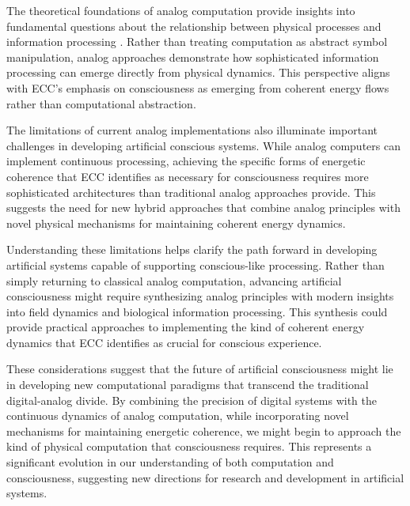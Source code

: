 The theoretical foundations of analog computation provide insights into fundamental questions about the relationship between physical processes and information processing \cite{Zauner2005}. Rather than treating computation as abstract symbol manipulation, analog approaches demonstrate how sophisticated information processing can emerge directly from physical dynamics. This perspective aligns with ECC's emphasis on consciousness as emerging from coherent energy flows rather than computational abstraction.

The limitations of current analog implementations also illuminate important challenges in developing artificial conscious systems. While analog computers can implement continuous processing, achieving the specific forms of energetic coherence that ECC identifies as necessary for consciousness requires more sophisticated architectures than traditional analog approaches provide. This suggests the need for new hybrid approaches that combine analog principles with novel physical mechanisms for maintaining coherent energy dynamics.

Understanding these limitations helps clarify the path forward in developing artificial systems capable of supporting conscious-like processing. Rather than simply returning to classical analog computation, advancing artificial consciousness might require synthesizing analog principles with modern insights into field dynamics and biological information processing. This synthesis could provide practical approaches to implementing the kind of coherent energy dynamics that ECC identifies as crucial for conscious experience.

These considerations suggest that the future of artificial consciousness might lie in developing new computational paradigms that transcend the traditional digital-analog divide. By combining the precision of digital systems with the continuous dynamics of analog computation, while incorporating novel mechanisms for maintaining energetic coherence, we might begin to approach the kind of physical computation that consciousness requires. This represents a significant evolution in our understanding of both computation and consciousness, suggesting new directions for research and development in artificial systems.